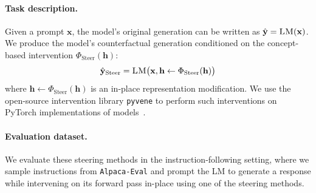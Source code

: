 \documentclass{article}
\theoremstyle{plain}
\theoremstyle{definition}
\theoremstyle{remark}
\renewcommand{\cite}{\citep}
\begin{document}

\paragraph{Task description.} Given a prompt $\mathbf{x}$, the model's original generation can be written as $\hat{\mathbf{y}} = \textsc{LM}(\mathbf{x})$. We produce the model's counterfactual generation conditioned on the concept-based intervention $\Phi_{\text{Steer}}(\mathbf{h})$:
\begin{equation}
    \hat{\mathbf{y}}_{\text{Steer}} = \textsc{LM}\bigl(\mathbf{x}, \mathbf{h} \leftarrow \Phi_{\text{Steer}}(\mathbf{h})\bigr)
\end{equation}
where $\mathbf{h} \leftarrow \Phi_{\text{Steer}}(\mathbf{h})$ is an in-place representation modification. We use the open-source intervention library \texttt{pyvene} to perform such interventions on PyTorch implementations of models~\cite{wu-etal-2024-pyvene}.

\paragraph{Evaluation dataset.} 
We evaluate these steering methods
in the instruction-following setting, where
we sample instructions from \texttt{Alpaca-Eval} \cite{alpaca_eval} and prompt the LM to generate a response while intervening on its forward pass in-place using one of the steering methods.
\end{document}
